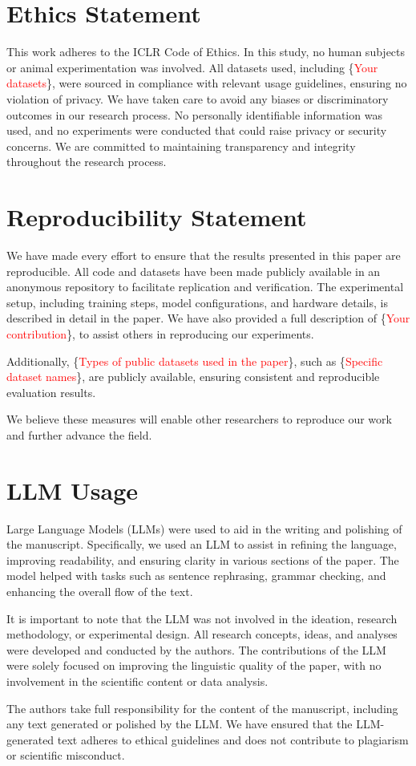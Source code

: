 \section{Ethics Statement}
This work adheres to the ICLR Code of Ethics. In this study, no human subjects or animal experimentation was involved. All datasets used, including \{\textcolor{red}{Your datasets}\}, were sourced in compliance with relevant usage guidelines, ensuring no violation of privacy. We have taken care to avoid any biases or discriminatory outcomes in our research process. No personally identifiable information was used, and no experiments were conducted that could raise privacy or security concerns. We are committed to maintaining transparency and integrity throughout the research process.

\section{Reproducibility Statement}
We have made every effort to ensure that the results presented in this paper are reproducible. All code and datasets have been made publicly available in an anonymous repository to facilitate replication and verification. The experimental setup, including training steps, model configurations, and hardware details, is described in detail in the paper. We have also provided a full description of \{\textcolor{red}{Your contribution}\}, to assist others in reproducing our experiments.

Additionally, \{\textcolor{red}{Types of public datasets used in the paper}\}, such as \{\textcolor{red}{Specific dataset names}\}, are publicly available, ensuring consistent and reproducible evaluation results.

We believe these measures will enable other researchers to reproduce our work and further advance the field.

\section{LLM Usage}
Large Language Models (LLMs) were used to aid in the writing and polishing of the manuscript. Specifically, we used an LLM to assist in refining the language, improving readability, and ensuring clarity in various sections of the paper. The model helped with tasks such as sentence rephrasing, grammar checking, and enhancing the overall flow of the text.

It is important to note that the LLM was not involved in the ideation, research methodology, or experimental design. All research concepts, ideas, and analyses were developed and conducted by the authors. The contributions of the LLM were solely focused on improving the linguistic quality of the paper, with no involvement in the scientific content or data analysis.

The authors take full responsibility for the content of the manuscript, including any text generated or polished by the LLM. We have ensured that the LLM-generated text adheres to ethical guidelines and does not contribute to plagiarism or scientific misconduct.